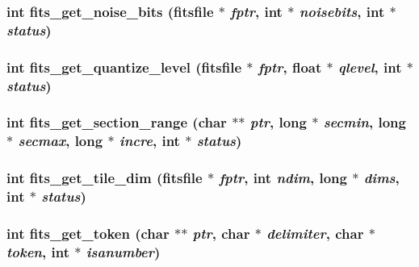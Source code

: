 \subsubsection{\setlength{\rightskip}{0pt plus 5cm}int fits\_\-get\_\-noise\_\-bits (\bf{fitsfile} $\ast$ {\em fptr}, int $\ast$ {\em noisebits}, int $\ast$ {\em status})}\label{src_2fitsio_8h_7d1812eaa72231d5e206211e9ebfc6bb}


\subsubsection{\setlength{\rightskip}{0pt plus 5cm}int fits\_\-get\_\-quantize\_\-level (\bf{fitsfile} $\ast$ {\em fptr}, float $\ast$ {\em qlevel}, int $\ast$ {\em status})}\label{src_2fitsio_8h_d95ec691ba0074de25ff98953fc30ac0}


\subsubsection{\setlength{\rightskip}{0pt plus 5cm}int fits\_\-get\_\-section\_\-range (char $\ast$$\ast$ {\em ptr}, long $\ast$ {\em secmin}, long $\ast$ {\em secmax}, long $\ast$ {\em incre}, int $\ast$ {\em status})}\label{src_2fitsio_8h_dc8334ac011d7b943c74b4ab5634ca83}


\subsubsection{\setlength{\rightskip}{0pt plus 5cm}int fits\_\-get\_\-tile\_\-dim (\bf{fitsfile} $\ast$ {\em fptr}, int {\em ndim}, long $\ast$ {\em dims}, int $\ast$ {\em status})}\label{src_2fitsio_8h_0f81ea785d4e10271f6ace88d7dda0a9}


\subsubsection{\setlength{\rightskip}{0pt plus 5cm}int fits\_\-get\_\-token (char $\ast$$\ast$ {\em ptr}, char $\ast$ {\em delimiter}, char $\ast$ {\em token}, int $\ast$ {\em isanumber})}\label{src_2fitsio_8h_ca9b90d253500bbaedc01bf68a237bbc}


